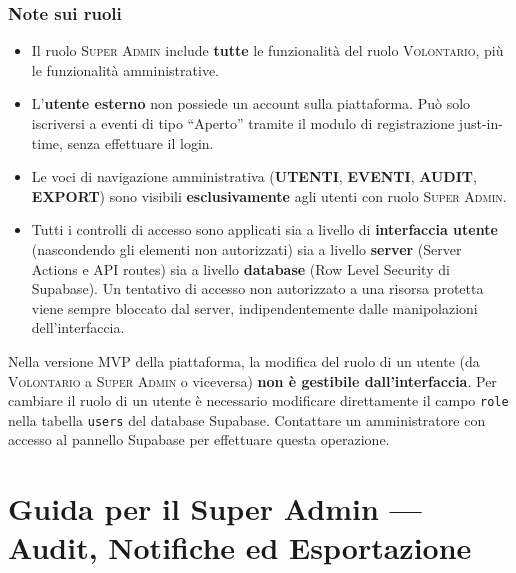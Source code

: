 \documentclass[a4paper,11pt,oneside]{book}
\newcommand{\menuitem}[1]{\textsf{\textbf{#1}}}
\newcommand{\campo}[1]{\texttt{#1}}
\newcommand{\ruolo}[1]{\textsc{#1}}
\begin{document}
\subsection{Note sui ruoli}

\begin{itemize}[leftmargin=1.5em]
  \item Il ruolo \ruolo{Super Admin} include \textbf{tutte} le funzionalit\`a del ruolo \ruolo{Volontario}, pi\`u le funzionalit\`a amministrative.
  \item L'\textbf{utente esterno} non possiede un account sulla piattaforma. Pu\`o solo iscriversi a eventi di tipo ``Aperto'' tramite il modulo di registrazione just-in-time, senza effettuare il login.
  \item Le voci di navigazione amministrativa (\menuitem{UTENTI}, \menuitem{EVENTI}, \menuitem{AUDIT}, \menuitem{EXPORT}) sono visibili \textbf{esclusivamente} agli utenti con ruolo \ruolo{Super Admin}.
  \item Tutti i controlli di accesso sono applicati sia a livello di \textbf{interfaccia utente} (nascondendo gli elementi non autorizzati) sia a livello \textbf{server} (Server Actions e API routes) sia a livello \textbf{database} (Row Level Security di Supabase). Un tentativo di accesso non autorizzato a una risorsa protetta viene sempre bloccato dal server, indipendentemente dalle manipolazioni dell'interfaccia.
\end{itemize}

\begin{warningbox}
Nella versione MVP della piattaforma, la modifica del ruolo di un utente (da \ruolo{Volontario} a \ruolo{Super Admin} o viceversa) \textbf{non \`e gestibile dall'interfaccia}. Per cambiare il ruolo di un utente \`e necessario modificare direttamente il campo \campo{role} nella tabella \campo{users} del database Supabase. Contattare un amministratore con accesso al pannello Supabase per effettuare questa operazione.
\end{warningbox}


\chapter{Guida per il Super Admin --- Audit, Notifiche ed Esportazione}
\label{ch:admin-audit-notifiche-export}
\end{document}
